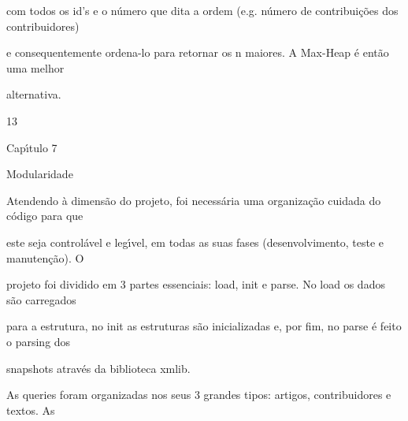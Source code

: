 \documentclass[a4paper,portrait,12pt]{article}
\begin{document}
\begin{flushleft}
com todos os id's e o número que dita a ordem (e.g. número de contribuições dos contribuidores)
\end{flushleft}


\begin{flushleft}
e consequentemente ordena-lo para retornar os n maiores. A Max-Heap é então uma melhor
\end{flushleft}


\begin{flushleft}
alternativa.
\end{flushleft}





13





\begin{flushleft}
\newpage
Cap\i{}́tulo 7
\end{flushleft}





\begin{flushleft}
Modularidade
\end{flushleft}


\begin{flushleft}
Atendendo à dimensão do projeto, foi necessária uma organização cuidada do código para que
\end{flushleft}


\begin{flushleft}
este seja controlável e leg\i{}́vel, em todas as suas fases (desenvolvimento, teste e manutenção). O
\end{flushleft}


\begin{flushleft}
projeto foi dividido em 3 partes essenciais: load, init e parse. No load os dados são carregados
\end{flushleft}


\begin{flushleft}
para a estrutura, no init as estruturas são inicializadas e, por fim, no parse é feito o parsing dos
\end{flushleft}


\begin{flushleft}
snapshots através da biblioteca xmlib.
\end{flushleft}


\begin{flushleft}
As queries foram organizadas nos seus 3 grandes tipos: artigos, contribuidores e textos. As
\end{flushleft}
\end{document}
